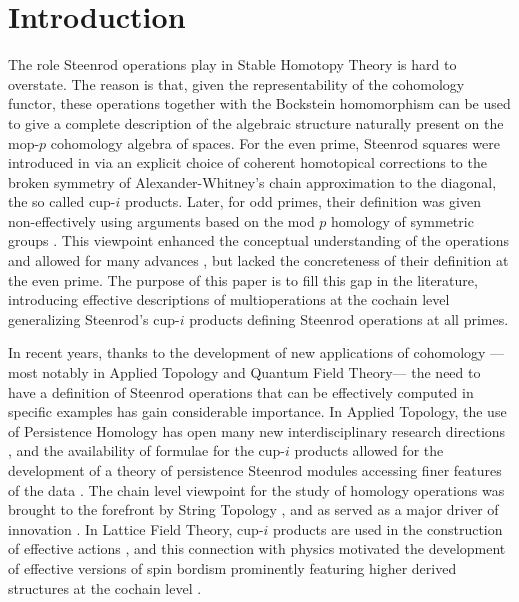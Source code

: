 
\section{Introduction} \label{s:introduction}

The role Steenrod operations play in Stable Homotopy Theory is hard to overstate. The reason is that, given the representability of the cohomology functor, these operations together with the Bockstein homomorphism can be used to give a complete description of the algebraic structure naturally present on the mop-$p$ \mbox{cohomology} algebra of spaces. For the even prime, Steenrod squares were introduced in \cite{steenrod47products} via an explicit choice of coherent homotopical corrections to the broken symmetry of Alexander-Whitney's chain approximation to the diagonal, the so called cup-$i$ products.
Later, for odd primes, their definition was given non-effectively using arguments based on the mod $p$ homology of symmetric groups \cites{steenrod53symmetric, steenrod53cyclic, steenrod62operations}.
This viewpoint enhanced the conceptual understanding of the operations and allowed for many advances \cites{adem1952iteration, milnor1958dual, adams1995stable}, but lacked the concreteness of their definition at the even prime.
The purpose of this paper is to fill this gap in the literature, introducing effective descriptions of multioperations at the cochain level generalizing Steenrod's cup-$i$ products defining Steenrod operations at all primes. 

In recent years, thanks to the development of new applications of cohomology ---most notably in Applied Topology and Quantum Field Theory--- the need to have a definition of Steenrod operations that can be effectively computed in specific examples has gain considerable importance. In Applied Topology, the use of Persistence Homology \cites{carlsson2009data, edelsbrunner2008persistent} has open many new interdisciplinary research directions \cites{de2007coverage,chan2013topology,lee2017quantifying}, and the availability of formulae for the cup-$i$ products allowed for the development of a theory of persistence Steenrod modules accessing finer features of the data \cite{medina2018persistence}.
The chain level viewpoint for the study of homology operations was brought to the forefront by String Topology \cite{Sullivanoverview}, and as served as a major driver of innovation \cites{TZ, hoch2}.
In Lattice Field Theory, cup-$i$ products are used in the construction of effective actions \cite{gaiotto2016spin, bhardwaj2017state, kapustin2017fermionic}, and this connection with physics motivated the development of effective versions of spin bordism \cites{brumfiel2016pontrjagin, brumfiel2018pontrjagin} prominently featuring higher derived structures at the cochain level \cite{medina2020cartan, medina2020adem}.

